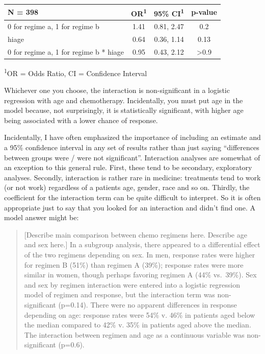 \documentclass[]{book}
\begin{document}
\captionsetup[table]{labelformat=empty,skip=1pt}
\begin{longtable}{lccc}
\toprule
\textbf{N = 398} & \textbf{OR}\textsuperscript{1} & \textbf{95\% CI}\textsuperscript{1} & \textbf{p-value} \\ 
\midrule
0 for regime a, 1 for regime b & 1.41 & 0.81, 2.47 & 0.2 \\ 
hiage & 0.64 & 0.36, 1.14 & 0.13 \\ 
0 for regime a, 1 for regime b * hiage & 0.95 & 0.43, 2.12 & >0.9 \\ 
\bottomrule
\end{longtable}
\vspace{-5mm}
\begin{minipage}{\linewidth}
\textsuperscript{1}OR = Odds Ratio, CI = Confidence Interval \\ 
\end{minipage}

Whichever one you choose, the interaction is non-significant in a logistic regression with age and chemotherapy. Incidentally, you must put age in the model because, not surprisingly, it is statistically significant, with higher age being associated with a lower chance of response.

Incidentally, I have often emphasized the importance of including an estimate and a 95\% confidence interval in any set of results rather than just saying ``differences between groups were / were not significant''. Interaction analyses are somewhat of an exception to this general rule. First, these tend to be secondary, exploratory analyses. Secondly, interaction is rather rare in medicine: treatments tend to work (or not work) regardless of a patients age, gender, race and so on. Thirdly, the coefficient for the interaction term can be quite difficult to interpret. So it is often appropriate just to say that you looked for an interaction and didn't find one. A model answer might be:

\begin{quote}
{[}Describe main comparison between chemo regimens here. Describe age and sex here.{]} In a subgroup analysis, there appeared to a differential effect of the two regimens depending on sex. In men, response rates were higher for regimen B (51\%) than regimen A (39\%); response rates were more similar in women, though perhaps favoring regimen A (44\% vs.~39\%). Sex and sex by regimen interaction were entered into a logistic regression model of regimen and response, but the interaction term was non-significant (p=0.14). There were no apparent differences in response depending on age: response rates were 54\% v. 46\% in patients aged below the median compared to 42\% v. 35\% in patients aged above the median. The interaction between regimen and age as a continuous variable was non-significant (p=0.6).
\end{quote}
\end{document}

